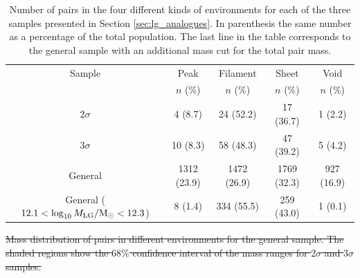 \documentclass{emulateapj}
\newcommand{\Msun}{{\ifmmode{{\rm {M_{\odot}}}}\else{${\rm{M_{\odot}}}$}\fi}}
\providecommand{\DIFdel}[1]{{\protect\color{red}\sout{#1}}}                      %
\providecommand{\DIFaddend}{} %
\providecommand{\DIFdelbegin}{} %
\begin{document}
\DIFaddend \begin{table}
\begin{center}
\begin{tabular}{ccccc}\hline\hline
Sample & Peak & Filament & Sheet & Void\\
       & $n$ (\%) & $n$ (\%) & $n$ (\%) & $n$ (\%) \\\hline
2$\sigma$ & 4 (8.7) & 24 (52.2) &  17 (36.7) & 1 (2.2)\\
3$\sigma$ & 10 (8.3) & 58 (48.3) & 47 (39.2) & 5 (4.2)\\  
General & 1312 (23.9) & 1472 (26.9) & 1769 (32.3) & 927 (16.9)\\
General ($12.1<\log_{10} M_{\rm LG}/\Msun<12.3$)& 8 (1.4) & 334 (55.5) & 259
(43.0) & 1 (0.1)\\
\hline\hline
\end{tabular}
\caption{
Number of pairs in the four different kinds of environments for each
of the three samples presented in Section \ref{sec:lg_analogues}. 
In parenthesis the same number as a percentage of the total population.
The last line in the table corresponds to the general sample with an
additional mass cut for the total pair mass.  
\label{table:web_type}}
\end{center}
\end{table}




\DIFdelbegin %
{%
\DIFdel{Mass distribution of pairs in different environments
for the general sample.
The shaded regions show the $68\%$ confidence interval of the mass ranges for $2\sigma$ and $3\sigma$
samples.  
}%
}
\end{document}
